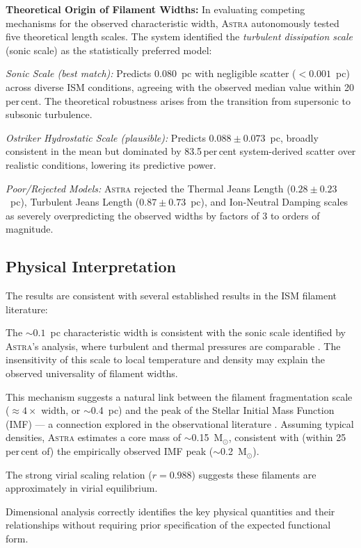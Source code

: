 \documentclass[usenatbib]{rasti}
\newcommand{\astra}{\textsc{Astra}\xspace}
\begin{document}
\textbf{Theoretical Origin of Filament Widths:}
In evaluating competing mechanisms for the observed characteristic width, \astra autonomously tested five theoretical length scales. The system identified the \emph{turbulent dissipation scale} (sonic scale) as the statistically preferred model:
\begin{description}
  \item \emph{Sonic Scale (best match):} Predicts $0.080$~pc with negligible scatter ($<0.001$~pc) across diverse ISM conditions, agreeing with the observed median value within 20\,per\,cent. The theoretical robustness arises from the transition from supersonic to subsonic turbulence.
  \item \emph{Ostriker Hydrostatic Scale (plausible):} Predicts $0.088 \pm 0.073$~pc, broadly consistent in the mean but dominated by 83.5\,per\,cent system-derived scatter over realistic conditions, lowering its predictive power.
  \item \emph{Poor/Rejected Models:} \astra rejected the Thermal Jeans Length ($0.28 \pm 0.23$~pc), Turbulent Jeans Length ($0.87 \pm 0.73$~pc), and Ion-Neutral Damping scales as severely overpredicting the observed widths by factors of 3 to orders of magnitude. 
\end{description}

\subsection{Physical Interpretation}
\label{sec:tc1:interpretation}

The results are consistent with several established results in the ISM filament literature:
\begin{description}
  \item The ${\sim}0.1$~pc characteristic width is consistent with the sonic scale identified by \astra's analysis, where turbulent and thermal pressures are comparable \citep{Arzoumanian2011}. The insensitivity of this scale to local temperature and density may explain the observed universality of filament widths.
  \item This mechanism suggests a natural link between the filament fragmentation scale ($\approx 4\times$ width, or $\sim$0.4~pc) and the peak of the Stellar Initial Mass Function (IMF) --- a connection explored in the observational literature \citep[e.g.][]{Andre2014}. Assuming typical densities, \astra estimates a core mass of $\sim$0.15~M$_\odot$, consistent with (within 25\,per\,cent of) the empirically observed IMF peak ($\sim$0.2~M$_\odot$).
  \item The strong virial scaling relation ($r = 0.988$) suggests these filaments are approximately in virial equilibrium.
  \item Dimensional analysis correctly identifies the key physical quantities and their relationships without requiring prior specification of the expected functional form.
\end{description}
\end{document}
